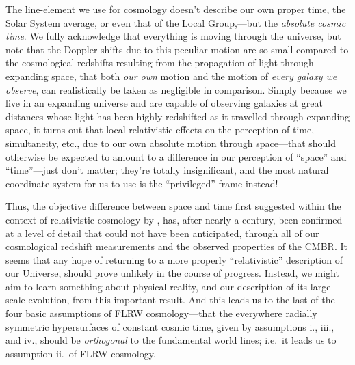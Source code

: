 \documentclass[12 pt]{article}
\begin{document}
The line-element we use for cosmology doesn't describe our own proper time, the Solar System average, or even that of the Local Group,---but the \textit{absolute cosmic time}. We fully acknowledge that everything is moving through the universe, but note that the Doppler shifts due to this peculiar motion are so small compared to the cosmological redshifts resulting from the propagation of light through expanding space, that both \textit{our own} motion and the motion of \textit{every galaxy we observe}, can realistically be taken as negligible in comparison. Simply because we live in an expanding universe and are capable of observing galaxies at great distances whose light has been highly redshifted as it travelled through expanding space, it turns out that local relativistic effects on the perception of time, simultaneity, etc., due to our own absolute motion through space---that should otherwise be expected to amount to a difference in our perception of ``space'' and ``time''---just don't matter; they're totally insignificant, and the most natural coordinate system for us to use is the ``privileged'' frame instead!

Thus, the objective difference between space and time first suggested within the context of relativistic cosmology by \citet{Einstein1917}, has, after nearly a century, been confirmed at a level of detail that could not have been anticipated, through all of our cosmological redshift measurements and the observed properties of the CMBR. It seems that any hope of returning to a more properly ``relativistic'' description of our Universe, should prove unlikely in the course of progress. Instead, we might aim to learn something about physical reality, and our description of its large scale evolution, from this important result. And this leads us to the last of the four basic assumptions of FLRW cosmology---that the everywhere radially symmetric hypersurfaces of constant cosmic time, given by assumptions i., iii., and iv., should be \textit{orthogonal} to the fundamental world lines; i.e.\ it leads us to assumption ii.\ of FLRW cosmology.
\end{document}
